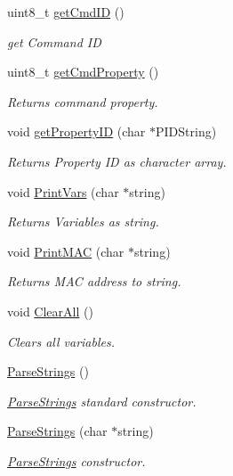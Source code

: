 \begin{DoxyCompactItemize}
uint8\+\_\+t \hyperlink{classParseStrings_a9fbcb70ec76da019901ac4d04d8f48d7}{get\+Cmd\+ID} ()
\begin{DoxyCompactList}\small\item\em get Command ID \end{DoxyCompactList}\item 
uint8\+\_\+t \hyperlink{classParseStrings_abda18520c80670139930230a2524b964}{get\+Cmd\+Property} ()
\begin{DoxyCompactList}\small\item\em Returns command property. \end{DoxyCompactList}\item 
void \hyperlink{classParseStrings_a9287dd0575737da66fa0ba2f8fdd003b}{get\+Property\+ID} (char $\ast$P\+I\+D\+String)
\begin{DoxyCompactList}\small\item\em Returns Property ID as character array. \end{DoxyCompactList}\item 
void \hyperlink{classParseStrings_a1dc6d3d8940788e397932ec456946461}{Print\+Vars} (char $\ast$string)
\begin{DoxyCompactList}\small\item\em Returns Variables as string. \end{DoxyCompactList}\item 
void \hyperlink{classParseStrings_a284bddb3fc4a2ecfb84a6ababce9deaa}{Print\+M\+AC} (char $\ast$string)
\begin{DoxyCompactList}\small\item\em Returns M\+AC address to string. \end{DoxyCompactList}\item 
void \hyperlink{classParseStrings_a5d694beffe019842455b788cca9cb26a}{Clear\+All} ()
\begin{DoxyCompactList}\small\item\em Clears all variables. \end{DoxyCompactList}\item 
\hyperlink{classParseStrings_a58ddb6be993306d69a0bbb08285fafa6}{Parse\+Strings} ()
\begin{DoxyCompactList}\small\item\em \hyperlink{classParseStrings}{Parse\+Strings} standard constructor. \end{DoxyCompactList}\item 
\hyperlink{classParseStrings_ab6f9a98b85f374dd26186cb55018e4a9}{Parse\+Strings} (char $\ast$string)
\begin{DoxyCompactList}\small\item\em \hyperlink{classParseStrings}{Parse\+Strings} constructor. \end{DoxyCompactList}\end{DoxyCompactItemize}
